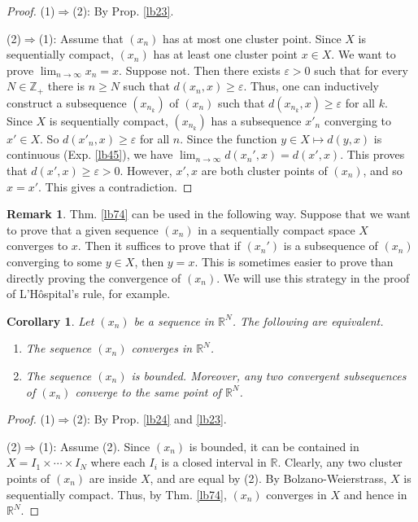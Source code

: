 \documentclass[12pt,b5paper,notitlepage]{article}
\theoremstyle{definition}
\newtheorem{rem}[df]{Remark}
\theoremstyle{plain}
\newtheorem{co}[df]{Corollary}
\newcommand{\Zbb}{\mathbb Z}
\newcommand{\Rbb}{\mathbb R}
\newcommand{\eps}{\varepsilon}
\numberwithin{equation}{section}
\begin{document}
\begin{proof}
(1)$\Rightarrow$(2): By Prop. \ref{lb23}.

(2)$\Rightarrow$(1): Assume that $(x_n)$ has at most one cluster point. Since $X$ is sequentially compact, $(x_n)$ has at least one cluster point $x\in X$. We want to prove $\lim_{n\rightarrow\infty} x_n=x$. Suppose not. Then there exists $\eps>0$ such that for every $N\in\Zbb_+$ there is $n\geq N$ such that $d(x_n,x)\geq \eps$. Thus, one can inductively construct a subsequence $(x_{n_k})$ of $(x_n)$ such that $d(x_{n_k},x)\geq\eps$ for all $k$. Since $X$ is sequentially compact, $(x_{n_k})$ has a subsequence $x'_n$ converging to $x'\in X$. So $d(x'_n,x)\geq\eps$ for all $n$. Since the function $y\in X\mapsto d(y,x)$ is continuous (Exp. \ref{lb45}), we have $\lim_{n\rightarrow\infty}d(x_n',x)=d(x',x)$. This proves that $d(x',x)\geq\eps>0$. However, $x',x$ are both cluster points of $(x_n)$, and so $x=x'$. This gives a contradiction. 
\end{proof}

\begin{rem}
Thm. \ref{lb74} can be used in the following way. Suppose that we want to prove that a given sequence $(x_n)$ in a sequentially compact space $X$ converges to $x$. Then it suffices to prove that if $(x_n')$ is a subsequence of $(x_n)$ converging to some $y\in X$, then $y=x$. This is sometimes easier to prove than directly proving the convergence of $(x_n)$. We will use this strategy in the proof of L'H\^ospital's rule, for example.
\end{rem}





\begin{co}\label{lb75}
Let $(x_n)$ be a sequence in $\Rbb^N$. The following are equivalent.
\begin{enumerate}[label=(\arabic*)]
\item The sequence $(x_n)$ converges in $\Rbb^N$.
\item The sequence $(x_n)$ is bounded. Moreover, any two convergent subsequences of $(x_n)$ converge to the same point of $\Rbb^N$.
\end{enumerate}
\end{co}

\begin{proof}
(1)$\Rightarrow$(2): By Prop. \ref{lb24} and \ref{lb23}. 

(2)$\Rightarrow$(1): Assume (2). Since $(x_n)$ is bounded, it can be contained in $X=I_1\times\cdots\times I_N$ where each $I_i$ is a closed interval in $\Rbb$. Clearly, any two cluster points of $(x_n)$ are inside $X$, and are equal by (2). By Bolzano-Weierstrass, $X$ is sequentially compact. Thus, by Thm. \ref{lb74}, $(x_n)$ converges in $X$ and hence in $\Rbb^N$.
\end{proof}
\end{document}
